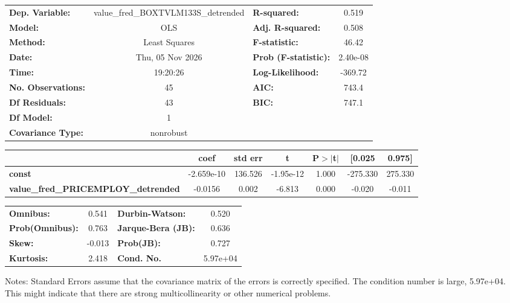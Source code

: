\begin{center}
\begin{tabular}{lclc}
\toprule
\textbf{Dep. Variable:}                     & value\_fred\_BOXTVLM133S\_detrended & \textbf{  R-squared:         } &     0.519   \\
\textbf{Model:}                             &                 OLS                 & \textbf{  Adj. R-squared:    } &     0.508   \\
\textbf{Method:}                            &            Least Squares            & \textbf{  F-statistic:       } &     46.42   \\
\textbf{Date:}                              &           Thu, 05 Nov 2026          & \textbf{  Prob (F-statistic):} &  2.40e-08   \\
\textbf{Time:}                              &               19:20:26              & \textbf{  Log-Likelihood:    } &   -369.72   \\
\textbf{No. Observations:}                  &                    45               & \textbf{  AIC:               } &     743.4   \\
\textbf{Df Residuals:}                      &                    43               & \textbf{  BIC:               } &     747.1   \\
\textbf{Df Model:}                          &                     1               & \textbf{                     } &             \\
\textbf{Covariance Type:}                   &              nonrobust              & \textbf{                     } &             \\
\bottomrule
\end{tabular}
\begin{tabular}{lcccccc}
                                            & \textbf{coef} & \textbf{std err} & \textbf{t} & \textbf{P$> |$t$|$} & \textbf{[0.025} & \textbf{0.975]}  \\
\midrule
\textbf{const}                              &   -2.659e-10  &      136.526     & -1.95e-12  &         1.000        &     -275.330    &      275.330     \\
\textbf{value\_fred\_PRICEMPLOY\_detrended} &      -0.0156  &        0.002     &    -6.813  &         0.000        &       -0.020    &       -0.011     \\
\bottomrule
\end{tabular}
\begin{tabular}{lclc}
\textbf{Omnibus:}       &  0.541 & \textbf{  Durbin-Watson:     } &    0.520  \\
\textbf{Prob(Omnibus):} &  0.763 & \textbf{  Jarque-Bera (JB):  } &    0.636  \\
\textbf{Skew:}          & -0.013 & \textbf{  Prob(JB):          } &    0.727  \\
\textbf{Kurtosis:}      &  2.418 & \textbf{  Cond. No.          } & 5.97e+04  \\
\bottomrule
\end{tabular}
\end{center}

Notes: \newline
 [1] Standard Errors assume that the covariance matrix of the errors is correctly specified. \newline
 [2] The condition number is large, 5.97e+04. This might indicate that there are \newline
 strong multicollinearity or other numerical problems.